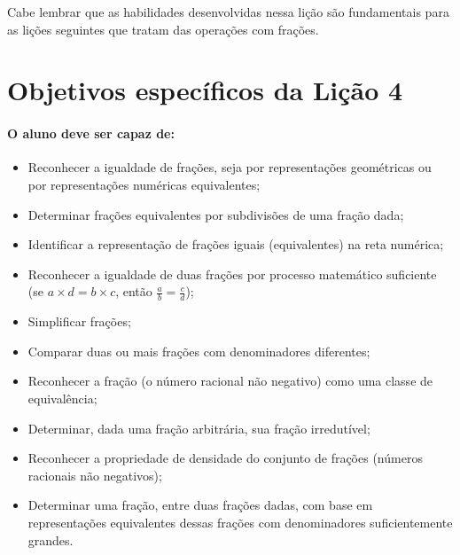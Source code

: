   Cabe lembrar que as habilidades desenvolvidas nessa lição são fundamentais
para as lições seguintes que tratam das operações com frações.

\section{Objetivos específicos da Lição 4}

\paragraph{O aluno deve ser capaz de:}

\begin{multicols}{2}
\begin{itemize} %
    \item       Reconhecer a igualdade de frações, seja por representações
geométricas ou por representações numéricas equivalentes;
    \item       Determinar frações equivalentes por subdivisões de uma fração
dada;
    \item       Identificar a representação de frações iguais (equivalentes) na
reta numérica;
    \item       Reconhecer a igualdade de duas frações por processo matemático
suficiente (se       $a \times d = b \times c$, então       $\frac{a}{b} =
\frac{c}{d}$);
    \item       Simplificar frações;
    \item       Comparar duas ou mais frações com denominadores diferentes;
    \item       Reconhecer a fração (o número racional não negativo) como uma
classe de equivalência;
    \item       Determinar, dada uma fração arbitrária, sua fração irredutível;
    \item       Reconhecer a propriedade de densidade do conjunto de frações
(números racionais não negativos);
    \item       Determinar uma fração, entre duas frações dadas, com base em
representações equivalentes dessas frações com denominadores suficientemente
grandes.
\end{itemize} %
\end{multicols}

